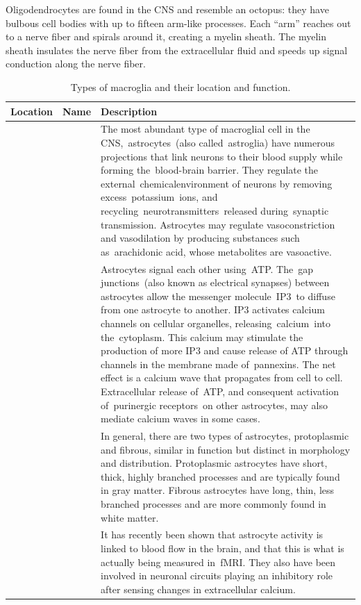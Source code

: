 Oligodendrocytes are found in the CNS and resemble an octopus: they have bulbous cell bodies with up to fifteen arm-like processes. Each ``arm'' reaches out to a nerve fiber and spirals around it, creating a myelin sheath. The myelin sheath insulates the nerve fiber from the extracellular fluid and speeds up signal conduction along the nerve fiber.

\begin{longtable}[t]{>{\raggedright\arraybackslash}p{5em}>{\raggedright\arraybackslash}p{10em}>{\raggedright\arraybackslash}p{20em}}
\caption{\label{tab:macroglia}Types of macroglia and their location and function.}\\
\toprule
Location & Name & Description\\
\midrule
\rowcolor{gray!6}   &  & The most abundant type of macroglial cell in the CNS, astrocytes (also called astroglia) have numerous projections that link neurons to their blood supply while forming the blood-brain barrier. They regulate the external chemicalenvironment of neurons by removing excess potassium ions, and recycling neurotransmitters released during synaptic transmission. Astrocytes may regulate vasoconstriction and vasodilation by producing substances such as arachidonic acid, whose metabolites are vasoactive.\\

 &  & Astrocytes signal each other using ATP. The gap junctions (also known as electrical synapses) between astrocytes allow the messenger molecule IP3 to diffuse from one astrocyte to another. IP3 activates calcium channels on cellular organelles, releasing calcium into the cytoplasm. This calcium may stimulate the production of more IP3 and cause release of ATP through channels in the membrane made of pannexins. The net effect is a calcium wave that propagates from cell to cell. Extracellular release of ATP, and consequent activation of purinergic receptors on other astrocytes, may also mediate calcium waves in some cases.\\

\rowcolor{gray!6}   &  & In general, there are two types of astrocytes, protoplasmic and fibrous, similar in function but distinct in morphology and distribution. Protoplasmic astrocytes have short, thick, highly branched processes and are typically found in gray matter. Fibrous astrocytes have long, thin, less branched processes and are more commonly found in white matter.\\

 & \multirow{-4}{10em}{\raggedright\arraybackslash Astrocytes} & It has recently been shown that astrocyte activity is linked to blood flow in the brain, and that this is what is actually being measured in fMRI. They also have been involved in neuronal circuits playing an inhibitory role after sensing changes in extracellular calcium.\\


\end{longtable}
